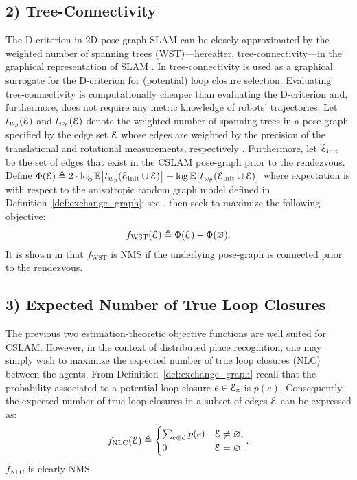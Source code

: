 \documentclass[conference]{IEEEtran}
\begin{document}
\subsection*{2) Tree-Connectivity}
\label{subsec:WST}
The D-criterion in 2D pose-graph SLAM can be closely approximated by the weighted number of
spanning trees (WST)---hereafter, tree-connectivity---in the graphical representation of SLAM
\cite{kasra16icra}. 
In \cite{kasra16wafr,kasra18ijrr} tree-connectivity is used as a graphical
surrogate for the D-criterion for (potential) loop closure selection.
Evaluating tree-connectivity is computationally cheaper than evaluating the
D-criterion and, furthermore, does not require any metric knowledge of robots' trajectories.
Let $t_{w_p}(\mathcal{E})$ and $t_{w_\theta}(\mathcal{E})$ denote the weighted number of
spanning trees in a pose-graph specified by the edge set
$\mathcal{E}$ whose edges are weighted by the precision of the translational and rotational
measurements, respectively \cite{kasra18ijrr}. Furthermore, let
$\mathcal{E}_\text{init}$ be the set of edges that exist in the CSLAM
pose-graph prior to the rendezvous. 
Define $\Phi(\mathcal{E}) \triangleq
   2\cdot \log \mathbb{E}\big[t_{w_p}(\mathcal{E}_\text{init} \cup {\mathcal{E}})\big] + \log
  \mathbb{E}\big[t_{w_\theta}(\mathcal{E}_\text{init} \cup {\mathcal{E}})\big]$ where
  expectation is with respect to the anisotropic random graph model defined in
  Definition~\ref{def:exchange_graph}; see \cite{kasra18ijrr}.
\citet{kasra18ijrr} then seek to maximize the following objective:
\begin{align}
  {f}_{\text{WST}}(\mathcal{E}) \triangleq
  \Phi(\mathcal{E}) - \Phi(\varnothing).
  \label{eq:WST}
\end{align}
It is shown in \cite{kasra18ijrr,kasra16wafr} that $f_\text{WST}$
is NMS if the underlying pose-graph is connected prior to the rendezvous.
\subsection*{3) Expected Number of True Loop Closures}
\label{subsec:NLC} The previous two estimation-theoretic objective functions are well suited for
CSLAM. However, in the context of distributed place recognition, one may simply wish to
maximize the expected number of true loop closures (NLC) between the agents.
From Definition~\ref{def:exchange_graph} recall that the probability associated to a potential loop closure
$e \in \mathcal{E}_\mathsf{x} $ is $p(e)$. Consequently, the expected
number of true loop closures in a subset of edges $\mathcal{E}$ can be expressed as:
\begin{equation}
  f_{\text{NLC}}(\mathcal{E}) \triangleq  \begin{cases}
\sum_{e \in
  \mathcal{E}} p(e) & \mathcal{E} \neq \varnothing,\\
  0 & \mathcal{E} = \varnothing.
  \end{cases}.  \label{eq:NLC} 
\end{equation}
$f_\text{NLC}$ is clearly NMS.
\end{document}
